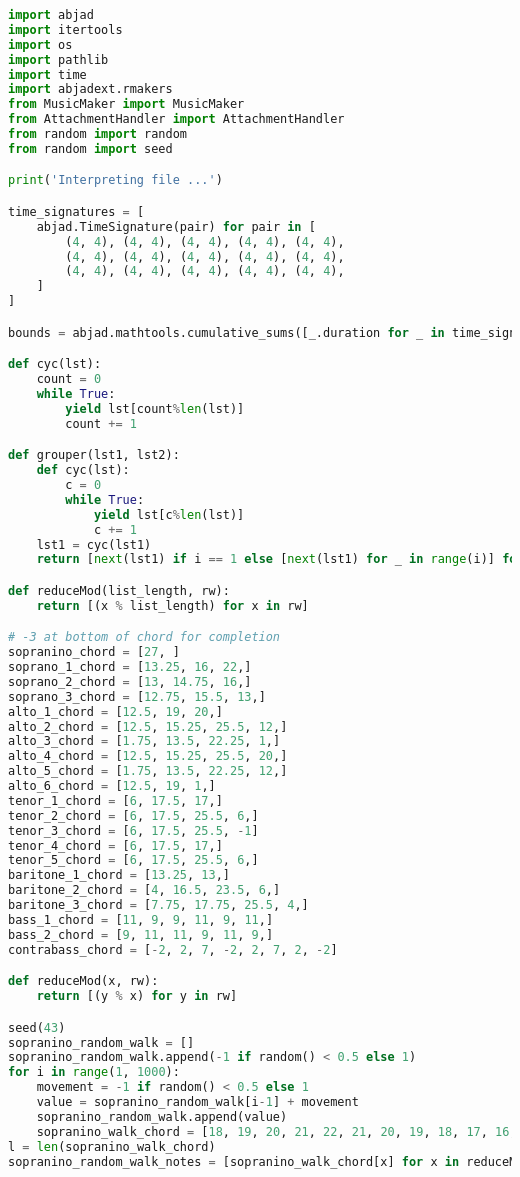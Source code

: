 \begin{lstlisting}[language=Python, caption=Invocation Source Code]
import abjad
import itertools
import os
import pathlib
import time
import abjadext.rmakers
from MusicMaker import MusicMaker
from AttachmentHandler import AttachmentHandler
from random import random
from random import seed

print('Interpreting file ...')

time_signatures = [
    abjad.TimeSignature(pair) for pair in [
        (4, 4), (4, 4), (4, 4), (4, 4), (4, 4),
        (4, 4), (4, 4), (4, 4), (4, 4), (4, 4),
        (4, 4), (4, 4), (4, 4), (4, 4), (4, 4),
    ]
]

bounds = abjad.mathtools.cumulative_sums([_.duration for _ in time_signatures])

def cyc(lst):
    count = 0
    while True:
        yield lst[count%len(lst)]
        count += 1

def grouper(lst1, lst2):
    def cyc(lst):
        c = 0
        while True:
            yield lst[c%len(lst)]
            c += 1
    lst1 = cyc(lst1)
    return [next(lst1) if i == 1 else [next(lst1) for _ in range(i)] for i in lst2]

def reduceMod(list_length, rw):
    return [(x % list_length) for x in rw]

# -3 at bottom of chord for completion
sopranino_chord = [27, ]
soprano_1_chord = [13.25, 16, 22,]
soprano_2_chord = [13, 14.75, 16,]
soprano_3_chord = [12.75, 15.5, 13,]
alto_1_chord = [12.5, 19, 20,]
alto_2_chord = [12.5, 15.25, 25.5, 12,]
alto_3_chord = [1.75, 13.5, 22.25, 1,]
alto_4_chord = [12.5, 15.25, 25.5, 20,]
alto_5_chord = [1.75, 13.5, 22.25, 12,]
alto_6_chord = [12.5, 19, 1,]
tenor_1_chord = [6, 17.5, 17,]
tenor_2_chord = [6, 17.5, 25.5, 6,]
tenor_3_chord = [6, 17.5, 25.5, -1]
tenor_4_chord = [6, 17.5, 17,]
tenor_5_chord = [6, 17.5, 25.5, 6,]
baritone_1_chord = [13.25, 13,]
baritone_2_chord = [4, 16.5, 23.5, 6,]
baritone_3_chord = [7.75, 17.75, 25.5, 4,]
bass_1_chord = [11, 9, 9, 11, 9, 11,]
bass_2_chord = [9, 11, 11, 9, 11, 9,]
contrabass_chord = [-2, 2, 7, -2, 2, 7, 2, -2]

def reduceMod(x, rw):
    return [(y % x) for y in rw]

seed(43)
sopranino_random_walk = []
sopranino_random_walk.append(-1 if random() < 0.5 else 1)
for i in range(1, 1000):
    movement = -1 if random() < 0.5 else 1
    value = sopranino_random_walk[i-1] + movement
    sopranino_random_walk.append(value)
    sopranino_walk_chord = [18, 19, 20, 21, 22, 21, 20, 19, 18, 17, 16, 15, 14, 13, 12, 11, 10, 9, 8, 7, 6, 5, 4, 3, 2, 1, 0, -1, -2, -1, 0, 1, 2, 3, 4, 5, 6, 7, 8, 9, 10, 11, 12, 13, 14, 15, 16, 17, ]
l = len(sopranino_walk_chord)
sopranino_random_walk_notes = [sopranino_walk_chord[x] for x in reduceMod(l, sopranino_random_walk)]


\end{lstlisting}
